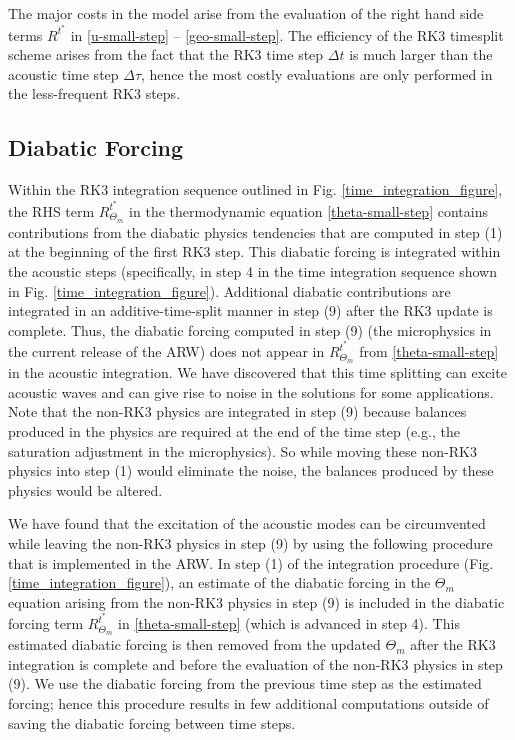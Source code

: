 The major costs in the model arise from the evaluation of the 
right hand side terms $R^{t^*}$ in \eqref{u-small-step}
-- \eqref{geo-small-step}.
The efficiency of the RK3 timesplit
scheme arises from the fact that the RK3 time step $\Delta t$ is much
larger than the acoustic time step $\Delta \tau$, hence the most costly
evaluations are only performed in the less-frequent RK3 steps.

\subsection{Diabatic Forcing}
\label{diabatic forcing subsection}

Within the RK3 integration sequence outlined in Fig.
\ref{time_integration_figure}, the RHS term $R_{\Theta_m}^{t^*}$ in the
thermodynamic equation \eqref{theta-small-step} contains contributions
from the diabatic physics tendencies that are computed in step (1) at
the beginning of the first RK3 step.  This diabatic forcing is
integrated within the acoustic steps (specifically, in step 4 in the
time integration sequence shown in Fig. \ref{time_integration_figure}).
Additional diabatic contributions
are integrated in an additive-time-split manner in step (9) after the RK3
update is complete.  Thus, the diabatic forcing computed in step (9) (the
microphysics in the current release of the ARW) does not appear in
$R_{\Theta_m}^{t^*}$ from \eqref{theta-small-step} in the acoustic
integration.  We have discovered that this time splitting can excite
acoustic waves and can give rise to noise in the solutions for some
applications.  Note that the non-RK3 physics are integrated in step (9)
because balances produced in the physics are required at the end of the
time step (e.g., the saturation adjustment in the microphysics).  So while
moving these non-RK3 physics into step (1) would eliminate the noise,
the balances produced by these physics would be altered.

We have found that the excitation of the acoustic modes can be
circumvented while leaving the non-RK3 physics in step (9) by using the
following procedure that is implemented in the ARW.  In step (1) of the
integration procedure (Fig. \ref{time_integration_figure}), an
estimate of the diabatic forcing in the $\Theta_m$ equation arising from the non-RK3
physics in step (9) is included in the diabatic forcing term
$R_{\Theta_m}^{t^*}$ in \eqref{theta-small-step} (which is advanced in step
4).  This estimated diabatic forcing is then removed from the updated
$\Theta_m$ after the RK3 integration is complete and before the evaluation
of the non-RK3 physics in step (9).  We use the diabatic forcing from
the previous time step as the estimated forcing; hence this procedure
results in few additional computations outside of saving the diabatic
forcing between time steps.

